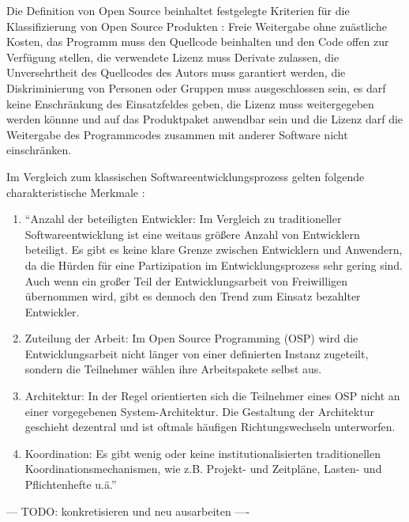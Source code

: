 Die Definition von Open Source beinhaltet festgelegte Kriterien für die Klassifizierung von Open Source Produkten \cite{suchen}: Freie Weitergabe ohne zuästliche Kosten, das Programm muss den Quellcode beinhalten und den Code offen zur Verfügung stellen, die verwendete Lizenz muss Derivate zulassen, die Unversehrtheit des Quellcodes des Autors muss garantiert werden, die Diskriminierung von Personen oder Gruppen muss ausgeschlossen sein, es darf keine Enschränkung des Einsatzfeldes geben, die Lizenz muss weitergegeben werden könnne und auf das Produktpaket anwendbar sein und die Lizenz darf die Weitergabe des Programmcodes zusammen mit anderer Software nicht einschränken.

Im Vergleich zum klassischen Softwareentwicklungsprozess gelten folgende charakteristische Merkmale \cite{suchen}:
\begin{enumerate}
\item “Anzahl der beteiligten Entwickler: Im Vergleich zu traditioneller Softwareentwicklung ist eine weitaus größere Anzahl von Entwicklern beteiligt. Es gibt es keine klare Grenze zwischen Entwicklern und Anwendern, da die Hürden für eine Partizipation im Entwicklungsprozess sehr gering sind. Auch wenn ein großer Teil der Entwicklungsarbeit von Freiwilligen übernommen wird, gibt es dennoch den Trend zum Einsatz bezahlter Entwickler.
\item Zuteilung der Arbeit: Im Open Source Programming (OSP) wird die Entwicklungsarbeit nicht länger von einer definierten Instanz zugeteilt, sondern die Teilnehmer wählen ihre Arbeitspakete selbst aus.
\item Architektur: In der Regel orientierten sich die Teilnehmer eines OSP nicht an einer vorgegebenen System-Architektur. Die Gestaltung der Architektur geschieht dezentral und ist oftmals häufigen Richtungswechseln unterworfen.
\item Koordination: Es gibt wenig oder keine institutionalisierten traditionellen Koordinationsmechanismen, wie z.B. Projekt- und Zeitpläne, Lasten- und Pflichtenhefte u.ä.” \cite{suchen}
\end{enumerate}

--- TODO: konkretisieren und neu ausarbeiten ----

